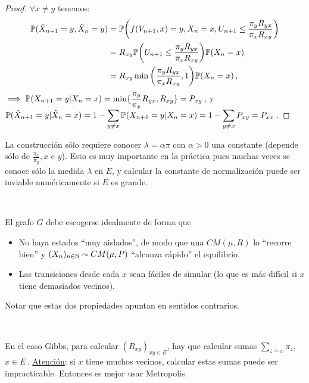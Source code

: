 \begin{proof}
\gris
$\forall x\neq y$ tenemos:
\begin{alignat*}{2}
    \P(\xhat_{n+1}=y,\xhat_{n}=y) & = \P\bigg(f(V_{n+1},x)=y,X_n=x,U_{n+1}\leq \displaystyle\frac{\pi_y R_{yx}}{\pi_x R_{xy}}\bigg) \\
     & = R_{xy}\P\bigg(U_{n+1}\leq \frac{\pi_y R_{yx}}{\pi_x R_{xy}}\bigg)\P(X_n=x)\\
     & = R_{xy}\min\bigg(\frac{\pi_y R_{yx}}{\pi_x R_{xy}},1\bigg)\P(X_n=x) \,,
\end{alignat*}
$\implies \P(X_{n+1}=y| X_n=x)=\displaystyle\min\{\frac{\pi_y}{\pi_x}R_{yx},R_{xy}\}=P_{xy}$\,,
\newline y $\P(\xhat_{n+1}=y|\xhat_{n}=x)=1-\displaystyle\sum_{y\neq x}\P(X_{n+1}=y|X_n=x)=1-\sum_{y\neq x}P_{xy}=P_{xx}$\,. \findem
\negro
\end{proof}
\begin{remark}
La construcción sólo requiere conocer $\lambda = \alpha \pi$ con $\alpha>0$ una constante (depende sólo de $\displaystyle \frac{\pi_x}{\pi_y},x$ e $y$). %
Esto es muy importante en la práctica pues muchas veces se conoce sólo la medida $\lambda$ en $E$, y calcular la constante de normalización puede ser inviable numéricamente si $E$ es grande.
\end{remark}
\vspace{.5cm} \\ %
\begin{remark}
El grafo $G$ debe escogerse idealmente de forma que
\begin{itemize}
    \item No haya estados ``muy aislados'', de modo que una $CM(\mu,R)$ lo ``recorre bien'' y $(X_n)_{n\in\N}\sim CM(\mu,P)$ ``alcanza rápido'' el equilibrio.
    \item Las transiciones desde cada $x$ sean fáciles de simular (lo que es m\'as difícil si $x$ tiene demasiados vecinos).
\end{itemize}
Notar que estas dos propiedades apuntan  en sentidos contrarios.
\end{remark}
\vspace{.5cm} \\ %
\begin{remark}  %
En el caso Gibbs,  para calcular $(R_{xy})_{xy\in E}$, hay que calcular sumas $\sum_{z\sim x}\pi_z$, $x\in E$\,.
    \newline \underline{Atención}: si $x$ tiene muchos vecinos, calcular estas sumas puede ser impracticable. Entonces es mejor usar Metropolis.
\end{remark}
